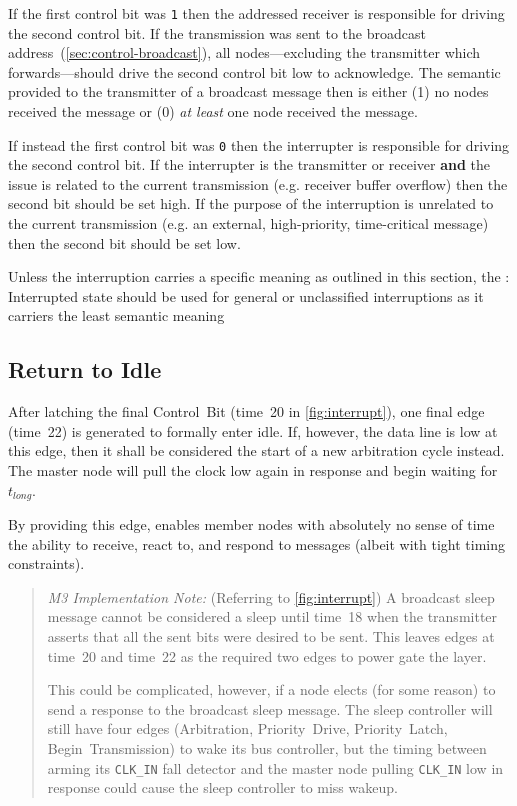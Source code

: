 If the first control bit was {\tt 1} then the addressed receiver is
responsible for driving the second control bit. If the transmission was sent
to the broadcast address~(\ref{sec:control-broadcast}), all nodes---excluding
the transmitter which forwards---should drive the second control bit low to
acknowledge. The semantic provided to the transmitter of a broadcast message
then is either (1) no nodes received the message or (0) {\em at least} one
node received the message.

If instead the first control bit was {\tt 0} then the interrupter is
responsible for driving the second control bit. If the interrupter is the
transmitter or receiver {\bf and} the issue is related to the current
transmission (e.g. receiver buffer overflow) then the second bit should be set
high. If the purpose of the interruption is unrelated to the current
transmission (e.g. an external, high-priority, time-critical message) then the
second bit should be set low.

Unless the interruption carries a specific meaning as outlined in this
section, the {: Interrupted} state should be used for general or
unclassified interruptions as it carriers the least semantic meaning

\subsection{Return to Idle}
\label{sec:protocol-return-idle}
After latching the final Control~Bit (time~20 in
\cref{fig:interrupt}), one final edge (time~22) is generated to formally
enter {\sc idle}. If, however, the data line is low at this edge, then it
shall be considered the start of a new arbitration cycle instead. The master
node will pull the clock low again in response and begin waiting for
$t_{long}$.

By providing this edge, \bus enables member nodes with absolutely no sense of
time the ability to receive, react to, and respond to messages (albeit with
tight timing constraints).

\begin{quote}
\textit{M3 Implementation Note:} (Referring to
\cref{fig:interrupt}) A broadcast sleep message cannot be considered a
sleep until time~18 when the transmitter asserts that all the sent bits were
desired to be sent. This leaves edges at time~20 and time~22 as the required
two edges to power gate the layer.

This could be complicated, however, if a node elects (for some reason) to send
a response to the broadcast sleep message. The sleep controller will still
have four edges (Arbitration, Priority~Drive, Priority~Latch,
Begin~Transmission) to wake its bus controller, but the timing between arming
its {\tt CLK\_IN} fall detector and the master node pulling {\tt CLK\_IN} low
in response could cause the sleep controller to miss wakeup.
\end{quote}
